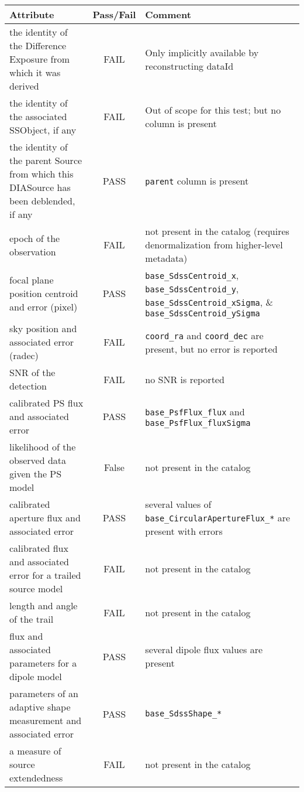 \documentclass[DM,lsstdraft,STR,toc]{lsstdoc}
\begin{document}
\begin{table}[h]
	\begin{tabular}{|p{}|c|p{}|}
		\hline
		Attribute & Pass/Fail & Comment \\
		\hline\hline
the identity of the Difference Exposure from which it was derived & FAIL & Only implicitly available by reconstructing dataId \\
		\hline
	the identity of the associated SSObject, if any & FAIL & Out of scope for this test; but no column is present \\
		\hline
		the identity of the parent Source from which this DIASource has been deblended, if any & PASS & \texttt{parent} column is present \\
		\hline
		epoch of the observation & FAIL & not present in the catalog (requires denormalization from higher-level metadata) \\
		\hline
	focal plane position centroid and error (pixel) & PASS &
		\texttt{base\_SdssCentroid\_x},
		\texttt{base\_SdssCentroid\_y},
		\texttt{base\_SdssCentroid\_xSigma}, \&
		\texttt{base\_SdssCentroid\_ySigma} \\
		\hline
		sky position and associated error (radec) & FAIL & \texttt{coord\_ra} and \texttt{coord\_dec} are present, but no error is reported \\
		\hline
	SNR of the detection & FAIL & no SNR is reported \\
		\hline
		calibrated PS flux and associated error & PASS & \texttt{base\_PsfFlux\_flux} and \texttt{base\_PsfFlux\_fluxSigma} \\
		\hline
	likelihood of the observed data given the PS model & False & not present in the catalog \\
		\hline
		calibrated aperture flux and associated error & PASS & several values of \texttt{base\_CircularApertureFlux\_*} are present with errors \\
		\hline
	calibrated flux and associated error for a trailed source model & FAIL & not present in the catalog \\
		\hline
	length and angle of the trail & FAIL & not present in the catalog \\
		\hline
		flux and associated parameters for a dipole model & PASS & several dipole flux values are present \\
		\hline
		parameters of an adaptive shape measurement and associated error & PASS & \texttt{base\_SdssShape\_*} \\
		\hline
	a measure of source extendedness & FAIL & not present in the catalog \\

\end{tabular}
\end{table}
\end{document}
